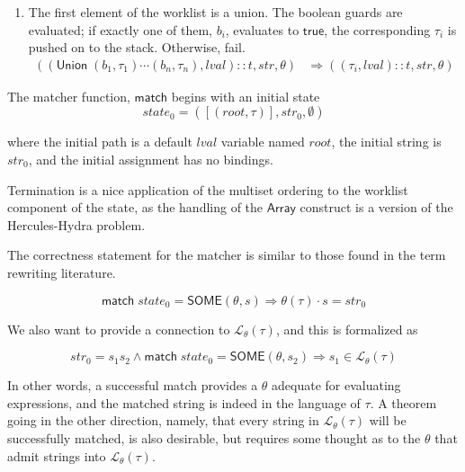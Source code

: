 \documentclass[svgnames]{llncs}
\newcommand{\konst}[1]{\ensuremath{\mathsf{#1}}}
\newcommand{\imp}{\Rightarrow}
\newcommand{\lval}{\ensuremath{\mathit{lval}}}
\newcommand{\LangTheta}[1]{\ensuremath{{\mathcal L}_{\theta}({#1})}}
\begin{document}
\begin{definition}
\begin{enumerate}
\item The first element of the worklist is a union. The boolean guards
  are evaluated; if exactly one of them, $b_i$, evaluates to \konst{true}, the
  corresponding $\tau_i$ is pushed on to the stack. Otherwise, fail.
%
\begin{align*}
((\konst{Union}\; (b_1,\tau_1) \cdots (b_n,\tau_n), \lval)::t, \mathit{str}, \theta)
   &\Rightarrow
  ((\tau_i,\lval)::t,\mathit{str}, \theta)
\end{align*}

\end{enumerate}

\noindent The matcher function, \konst{match} begins with an initial state
%
\[
  \mathit{state}_0 = ([(\mathit{root},\tau)],\mathit{str}_0,\emptyset)
\]

where the initial path is a default \lval{} variable named
$\mathit{root}$, the initial string is $\mathit{str}_0$, and the
initial assignment has no bindings.

\end{definition}

\begin{theorem}
Termination is a nice application of the multiset ordering to the
worklist component of the state, as the handling of the \konst{Array}
construct is a version of the Hercules-Hydra problem.
\end{theorem}

The correctness statement for the matcher is similar to those found in
the term rewriting literature.

\begin{theorem}

\[
  \konst{match}\; \mathit{state}_0 = \konst{SOME}(\theta, s)
  \imp \theta(\tau) \cdot s = \mathit{str}_0
\]

\noindent We also want to provide a connection to $\LangTheta{\tau}$,
and this is formalized as

\[
  \mathit{str}_0 = s_1 s_2 \land \konst{match}\; \mathit{state}_0 =
  \konst{SOME}(\theta, s_2) \imp s_1 \in \LangTheta{\tau}
\]

In other words, a successful match provides a $\theta$ adequate for
evaluating expressions, and the matched string is indeed in the
language of $\tau$. A theorem going in the other direction, namely,
that every string in $\LangTheta{\tau}$ will be successfully
matched, is also desirable, but requires some thought as to the
$\theta$ that admit strings into $\LangTheta{\tau}$.

\end{theorem}
\end{document}
